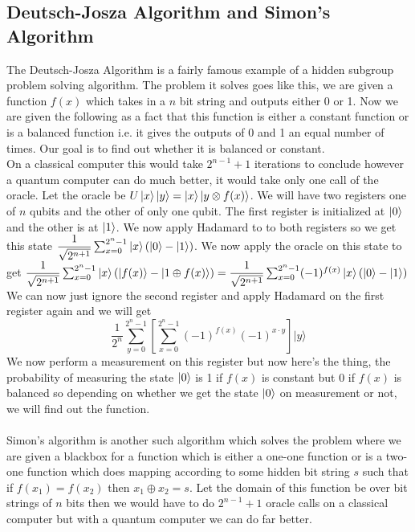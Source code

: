 \documentclass{report}
\begin{document}
\subsection{Deutsch-Josza Algorithm and Simon's Algorithm}
The Deutsch-Josza Algorithm is a fairly famous example of a hidden subgroup problem solving algorithm. The problem it solves goes like this, we are given a function $f(x)$ which takes in a $n$ bit string and outputs either 0 or 1. Now we are given the following as a fact that this function is either a constant function or is a balanced function i.e. it gives the outputs of 0 and 1 an equal number of times. Our goal is to find out whether it is balanced or constant.\\
On a classical computer this would take $2^{n-1}+1$ iterations to conclude however a quantum computer can do much better, it would take only one call of the oracle.
Let the oracle be $U\ket{x}\ket{y} = \ket{x}\ket{y \otimes f(x)}$. We will have two registers one of $n$ qubits and the other of only one qubit. The first register is initialized at $\ket{0}$ and the other is at $\ket{1}$. 
We now apply Hadamard to to both registers so we get this state $\dfrac{1}{\sqrt{2^{n+1}}}\sum_{x=0}^{2^n-1}\ket{x}(\ket{0}-\ket{1})$. We now apply the oracle on this state to get $\dfrac{1}{\sqrt{2^{n+1}}}\sum_{x=0}^{2^n-1}\ket{x}(\ket{f(x)}-\ket{1 \oplus f(x)}) = \dfrac{1}{\sqrt{2^{n+1}}}\sum_{x=0}^{2^n-1}(-1)^{f(x)}\ket{x}(\ket{0}-\ket{1})$\\
We can now just ignore the second register and apply Hadamard on the first register again and we will get $$\frac{1}{2^n}\sum_{y=0}^{2^n-1}\left[\sum_{x=0}^{2^n-1}(-1)^{f(x)}(-1)^{x \cdot y} \right]\vert y\rangle$$
We now perform a measurement on this register but now here's the thing, the probability of measuring the state $\ket{0}$ is 1 if $f(x)$ is constant but 0 if $f(x)$ is balanced so depending on whether we get the state $\ket{0}$ on measurement or not, we will find out the function.\\\\
Simon's algorithm is another such algorithm which solves the problem where we are given a blackbox for a function which is either a one-one function or is a two-one function which does mapping according to some hidden bit string $s$ such that if $f(x_1) = f(x_2)$ then $x_1 \oplus x_2 = s$. Let the domain of this function be over bit strings of $n$ bits then we would have to do $2^{n-1} + 1$ oracle calls on a classical computer but with a quantum computer we can do far better.\\
\end{document}
